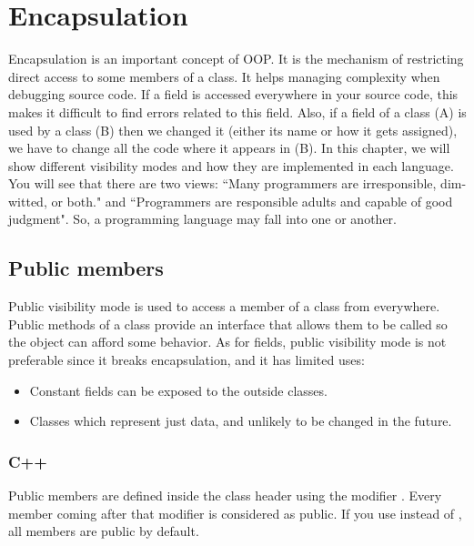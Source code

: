 \documentclass{KodeBook}
\begin{document}
\fi

\chapter{Encapsulation}

\begin{introduction}
	Encapsulation is an important concept of OOP. 
	It is the mechanism of restricting direct access to some members of a class.
	It helps managing complexity when debugging source code. 
	If a field is accessed everywhere in your source code, this makes it difficult to find errors related to this field. 
	Also, if a field of a class (A) is used by a class (B) then we changed it (either its name or how it gets assigned), we have to change all the code where it appears in (B).
	In this chapter, we will show different visibility modes and how they are implemented in each language.
	You will see that there are two views: ``Many programmers are irresponsible, dim-witted, or both." and ``Programmers are responsible adults and capable of good judgment".
	So, a programming language may fall into one or another.
\end{introduction} 

\section{Public members}

Public visibility mode is used to access a member of a class from everywhere. 
Public methods of a class provide an interface that allows them to be called so the object can afford some behavior. 
As for fields, public visibility mode is not preferable since it breaks encapsulation, and it has limited uses:
\begin{itemize}
	\item Constant fields can be exposed to the outside classes.%
	\item Classes which represent just data, and unlikely to be changed in the future.
\end{itemize}

\subsection{C++}

Public members are defined inside the class header using the modifier . 
Every member coming after that modifier is considered as public.
If you use  instead of , all members are public by default.
\end{document}
